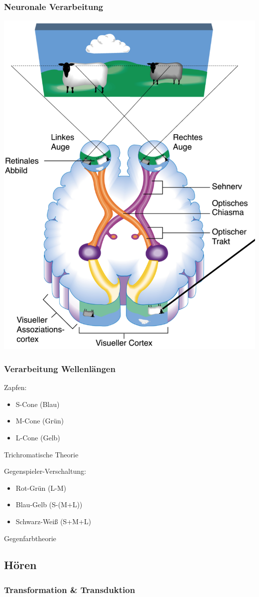 \subsubsection{Neuronale Verarbeitung}
\begin{center}
	\includegraphics[scale=.2]{img/Auge.png}
\end{center}

\subsubsection{Verarbeitung Wellenlängen}
Zapfen:
\begin{itemize}
	\item S-Cone (Blau)
	\item M-Cone (Grün)
	\item L-Cone (Gelb)
\end{itemize}

\rightarrow Trichromatische Theorie

Gegenspieler-Verschaltung:
\begin{itemize}
	\item Rot-Grün (L-M)
	\item Blau-Gelb (S-(M+L))
	\item Schwarz-Weiß (S+M+L)
\end{itemize}

\rightarrow Gegenfarbtheorie
\subsection{Hören}
\subsubsection{Transformation \& Transduktion}
